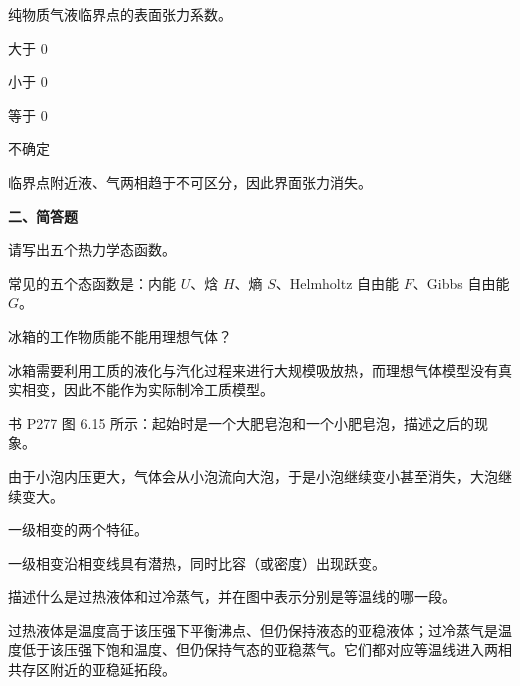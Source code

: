 \begin{question}
纯物质气液临界点的表面张力系数。
\begin{choiceoptions}
\item 大于 0
\item 小于 0
\item 等于 0
\item 不确定
\end{choiceoptions}
\begin{solution}
临界点附近液、气两相趋于不可区分，因此界面张力消失。
\end{solution}
\end{question}

\textbf{二、简答题}
\begin{question}
请写出五个热力学态函数。
\begin{solution}
常见的五个态函数是：内能 $U$、焓 $H$、熵 $S$、Helmholtz 自由能 $F$、Gibbs 自由能 $G$。
\end{solution}
\end{question}

\begin{question}
冰箱的工作物质能不能用理想气体？
\begin{solution}
冰箱需要利用工质的液化与汽化过程来进行大规模吸放热，而理想气体模型没有真实相变，因此不能作为实际制冷工质模型。
\end{solution}
\end{question}

\begin{question}
书 P277 图 6.15 所示：起始时是一个大肥皂泡和一个小肥皂泡，描述之后的现象。
\begin{solution}
由于小泡内压更大，气体会从小泡流向大泡，于是小泡继续变小甚至消失，大泡继续变大。
\end{solution}
\end{question}

\begin{question}
一级相变的两个特征。
\begin{solution}
一级相变沿相变线具有潜热，同时比容（或密度）出现跃变。
\end{solution}
\end{question}

\begin{question}
描述什么是过热液体和过冷蒸气，并在图中表示分别是等温线的哪一段。
\begin{solution}
过热液体是温度高于该压强下平衡沸点、但仍保持液态的亚稳液体；过冷蒸气是温度低于该压强下饱和温度、但仍保持气态的亚稳蒸气。它们都对应等温线进入两相共存区附近的亚稳延拓段。
\end{solution}
\end{question}

